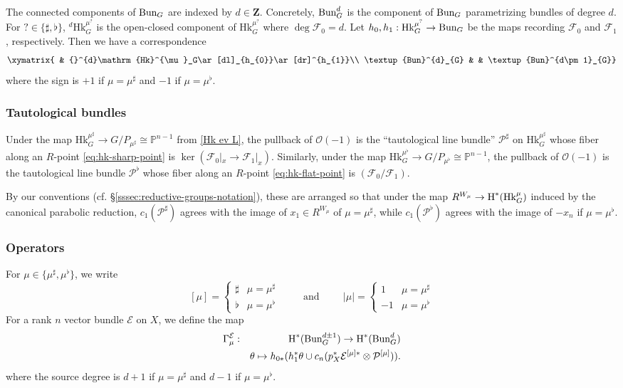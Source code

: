 \documentclass[reqno]{amsart}
\numberwithin{equation}{subsection}
\theoremstyle{definition}
\def\PP{\mathbb{P}}
\newcommand\cE{\mathcal{E}}
\newcommand\cF{\mathcal{F}}
\newcommand\cO{\mathcal{O}}
\newcommand\cP{\mathcal{P}}
\newcommand{\Bun}{\textup{Bun}}
\newcommand\Hk{\mathrm{Hk}}
\newcommand\ot{\otimes}
\newcommand{\cohog}[2]{\textup{H}^{#1}({#2})}     %
\newcommand\mt{\mapsto}
\newcommand\G\Gamma
\renewcommand{\th}{\theta}
\newcommand\sh{\sharp}
\newcommand{\Z}{\mathbf{Z}}
\begin{document}
The connected components of $\Bun_G$ are indexed by $d \in \Z$. Concretely, $\Bun_G^d$ is the component of $\Bun_G$ parametrizing bundles of degree $d$. For $? \in \{\sharp, \flat\}$, ${}^d \Hk_G^{\mu^?}$ is the open-closed component of $\Hk_G^{\mu^?}$ where $\deg \cF_0 = d$. Let $h_{0}, h_{1}: \Hk^{\mu^?}_G \to \Bun_{G}$ be the maps recording $\cF_{0}$ and $\cF_{1}$, respectively. Then we have a correspondence
\begin{equation*}
\xymatrix{ & {}^{d}\Hk^{\mu}_G\ar[dl]_{h_{0}}\ar[dr]^{h_{1}}\\
\Bun^{d}_{G} & & \Bun^{d\pm1}_{G}}
\end{equation*}
where the sign is $+1$ if $\mu = \mu^\sharp$ and $-1$ if $\mu = \mu^\flat$. 

\subsubsection{Tautological bundles}\label{sssec:gln-example-tautological}
Under the map $\Hk_G^{\mu^\sharp} \rightarrow G/P_{\mu^\sharp} \cong \PP^{n-1}$ from \eqref{Hk ev L}, the pullback of $\cO(-1)$ is the ``tautological line bundle'' $\cP^\sharp$ on $\Hk_G^{\mu^\sharp}$ whose fiber along an $R$-point \eqref{eq:hk-sharp-point} is $\ker(\cF_0|_x \rightarrow \cF_1|_x)$. Similarly, under the map $\Hk_G^{\mu^\flat} \rightarrow G/P_{\mu^\flat} \cong \PP^{n-1}$, the pullback of $\cO(-1)$ is the tautological line bundle $\cP^\flat$ whose fiber along an $R$-point \eqref{eq:hk-flat-point} is $(\cF_0/\cF_1)	$. 

By our conventions (cf. \S \ref{sssec:reductive-groups-notation}), these are arranged so that under the map $R^{W_\mu} \rightarrow \cohog{*}{\Hk^{\mu}_G}$ induced by the canonical parabolic reduction, $c_1(\cP^{\sh})$ agrees with the image of $x_1 \in R^{W_\mu}$ of $\mu = \mu^{\sharp}$, while $c_1(\cP^{\flat})$ agrees with the image of $-x_n$ if $\mu = \mu^{\flat}$. 

\subsubsection{Operators}\label{sssec:gln-example-operators} For $\mu \in \{\mu^\sharp, \mu^\flat\}$, we write 
\[
 [\mu]= 
\begin{cases} \sh & \mu =\mu^\sharp \\
\flat & \mu=\mu^\flat
\end{cases} \hspace{1cm} \text{and} \hspace{1cm}
|\mu| = 
\begin{cases} 1 & \mu =\mu^\sharp \\
-1 & \mu=\mu^\flat
\end{cases} 
\]
For a rank $n$ vector bundle $\cE$ on $X$, we define the map
\begin{eqnarray*}
\G_{\mu}^{\cE}   &:& \cohog{*}{\Bun_{G}^{d \pm 1 }} \to \cohog{*}{\Bun_{G}^{d}} \\
&& \th\mt h_{0*}(h_{1}^{*}\th\cup c_{n}(p_{X}^{*}\cE^{[\mu] *}\ot \cP^{[\mu]})).
\end{eqnarray*}
where the source degree is $d+1$ if $\mu = \mu^\sharp$ and $d-1$ if $\mu=\mu^\flat$. 
\end{document}
